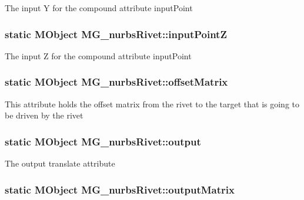 The input Y for the compound attribute input\-Point \hypertarget{class_m_g__nurbs_rivet_acd26e9adfc47fe51b82fe0f6c8ae9bb3}{
\subsubsection[{input\-Point\-Z}]{\setlength{\rightskip}{0pt plus 5cm}static M\-Object M\-G\-\_\-nurbs\-Rivet\-::input\-Point\-Z\hspace{0.3cm}{\ttfamily [static]}}}\label{class_m_g__nurbs_rivet_acd26e9adfc47fe51b82fe0f6c8ae9bb3}
The input Z for the compound attribute input\-Point \hypertarget{class_m_g__nurbs_rivet_a540b3de13a7788eec9d1c08973bb1515}{
\subsubsection[{offset\-Matrix}]{\setlength{\rightskip}{0pt plus 5cm}static M\-Object M\-G\-\_\-nurbs\-Rivet\-::offset\-Matrix\hspace{0.3cm}{\ttfamily [static]}}}\label{class_m_g__nurbs_rivet_a540b3de13a7788eec9d1c08973bb1515}
This attribute holds the offset matrix from the rivet to the target that is going to be driven by the rivet \hypertarget{class_m_g__nurbs_rivet_ac3d5177a9758f3b3ad1b61cad032229e}{
\subsubsection[{output}]{\setlength{\rightskip}{0pt plus 5cm}static M\-Object M\-G\-\_\-nurbs\-Rivet\-::output\hspace{0.3cm}{\ttfamily [static]}}}\label{class_m_g__nurbs_rivet_ac3d5177a9758f3b3ad1b61cad032229e}
The output translate attribute \hypertarget{class_m_g__nurbs_rivet_a5dc9d6a6ed4f7e24425c3f25f934eead}{
\subsubsection[{output\-Matrix}]{\setlength{\rightskip}{0pt plus 5cm}static M\-Object M\-G\-\_\-nurbs\-Rivet\-::output\-Matrix\hspace{0.3cm}{\ttfamily [static]}}}\label{class_m_g__nurbs_rivet_a5dc9d6a6ed4f7e24425c3f25f934eead}
